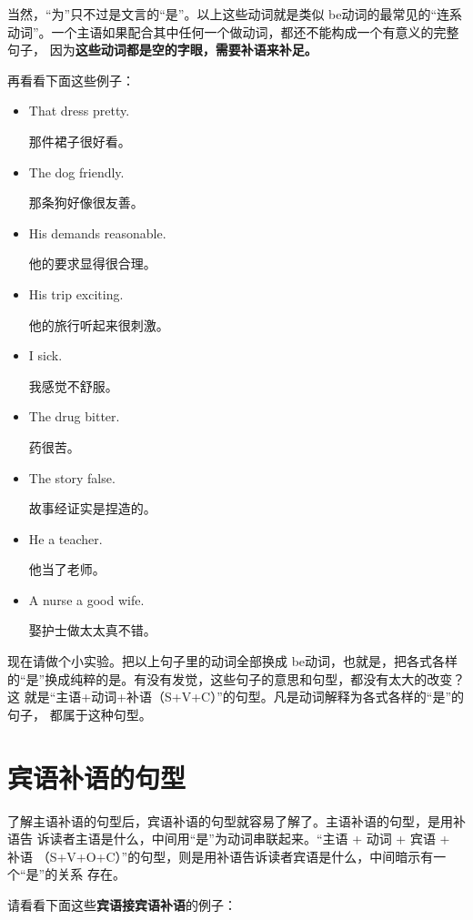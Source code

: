当然，“为”只不过是文言的“是”。以上这些动词就是类似 be动词的最常见的“连系
动词”。一个主语如果配合其中任何一个做动词，都还不能构成一个有意义的完整句子，
因为\textbf{这些动词都是空的字眼，需要补语来补足。}

再看看下面这些例子：

\begin{itemize}
\item  That dress  pretty.

  那件裙子很好看。
\item  The dog  friendly.

  那条狗好像很友善。
\item  His demands  reasonable.

  他的要求显得很合理。
\item  His trip  exciting.

  他的旅行听起来很刺激。
\item  I  sick.

  我感觉不舒服。
\item  The drug  bitter.

  药很苦。
\item  The story  false.

  故事经证实是捏造的。
\item  He  a teacher.

  他当了老师。
\item  A nurse  a good wife.

  娶护士做太太真不错。
\end{itemize}

现在请做个小实验。把以上句子里的动词全部换成 be动词，也就是，把各式各样
的“是”换成纯粹的是。有没有发觉，这些句子的意思和句型，都没有太大的改变？这
就是“主语+动词+补语（S+V+C）”的句型。凡是动词解释为各式各样的“是”的句子，
都属于这种句型。

\section{宾语补语的句型}

了解主语补语的句型后，宾语补语的句型就容易了解了。主语补语的句型，是用补语告
诉读者主语是什么，中间用“是”为动词串联起来。“主语 + 动词 + 宾语 + 补语
（S+V+O+C）”的句型，则是用补语告诉读者宾语是什么，中间暗示有一个“是”的关系
存在。

请看看下面这些\textbf{宾语接宾语补语}的例子：

